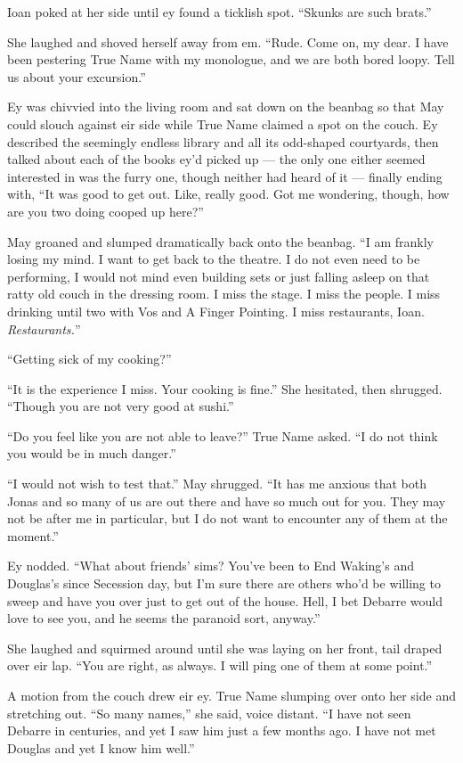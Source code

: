 Ioan poked at her side until ey found a ticklish spot. ``Skunks are such brats.''

She laughed and shoved herself away from em. ``Rude. Come on, my dear. I have been pestering True Name with my monologue, and we are both bored loopy. Tell us about your excursion.''

Ey was chivvied into the living room and sat down on the beanbag so that May could slouch against eir side while True Name claimed a spot on the couch. Ey described the seemingly endless library and all its odd-shaped courtyards, then talked about each of the books ey'd picked up — the only one either seemed interested in was the furry one, though neither had heard of it — finally ending with, ``It was good to get out. Like, really good. Got me wondering, though, how are you two doing cooped up here?''

May groaned and slumped dramatically back onto the beanbag. ``I am frankly losing my mind. I want to get back to the theatre. I do not even need to be performing, I would not mind even building sets or just falling asleep on that ratty old couch in the dressing room. I miss the stage. I miss the people. I miss drinking until two with Vos and A Finger Pointing. I miss restaurants, Ioan. \emph{Restaurants.}''

``Getting sick of my cooking?''

``It is the experience I miss. Your cooking is fine.'' She hesitated, then shrugged. ``Though you are not very good at sushi.''

``Do you feel like you are not able to leave?'' True Name asked. ``I do not think you would be in much danger.''

``I would not wish to test that.'' May shrugged. ``It has me anxious that both Jonas and so many of us are out there and have so much out for you. They may not be after me in particular, but I do not want to encounter any of them at the moment.''

Ey nodded. ``What about friends' sims? You've been to End Waking's and Douglas's since Secession day, but I'm sure there are others who'd be willing to sweep and have you over just to get out of the house. Hell, I bet Debarre would love to see you, and he seems the paranoid sort, anyway.''

She laughed and squirmed around until she was laying on her front, tail draped over eir lap. ``You are right, as always. I will ping one of them at some point.''

A motion from the couch drew eir ey. True Name slumping over onto her side and stretching out. ``So many names,'' she said, voice distant. ``I have not seen Debarre in centuries, and yet I saw him just a few months ago. I have not met Douglas and yet I know him well.''

